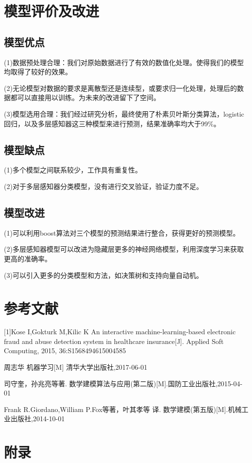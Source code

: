 \documentclass[UTF8,12pt,songti]{ctexart}
\begin{document}
\section{模型评价及改进}
\subsection{模型优点}
(1)数据预处理合理：我们对原始数据进行了有效的数值化处理。使得我们的模型均取得了较好的效果。\par
(2)无论模型对数据的要求是离散型还是连续型，或要求归一化处理，处理后的数据都可以直接用以训练。为未来的改进留下了空间。\par
(3)模型选用合理：我们经过研究分析，最终使用了朴素贝叶斯分类算法，logistic回归，以及多层感知器这三种模型来进行预测，结果准确率均大于99\%。
\subsection{模型缺点}
(1)多个模型之间联系较少，工作具有重复性。\par
(2)对于多层感知器分类模型，没有进行交叉验证，验证力度不足。
\subsection{模型改进}
(1)可以利用boost算法对三个模型的预测结果进行整合，获得更好的预测模型。\par
(2)多层感知器模型可以改进为隐藏层更多的神经网络模型，利用深度学习来获取更高的准确率。\par
(3)可以引入更多的分类模型和方法，如决策树和支持向量自动机。
\section{参考文献}
[1]Kose I,Gokturk M,Kilic K An interactive machine-learning-based electronic fraud and abuse detection system in healthcare insurance[J]. Applied Soft Computing, 2015, 36:S1568494615004585 \par
[2]周志华  机器学习[M] 清华大学出版社,2017-06-01\par
[3]司守奎，孙兆亮等著. 数学建模算法与应用(第二版)[M].国防工业出版社,2015-04-01 \par
[4]Frank R.Giordano,William P.Fox等著，叶其孝等 译. 数学建模(第五版)[M].机械工业出版社,2014-10-01\par
\section{附录}
\end{document}
